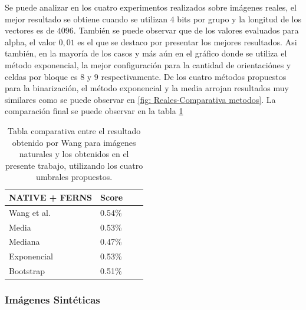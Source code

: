 		Se puede analizar en los cuatro experimentos realizados sobre imágenes reales, el mejor resultado se obtiene cuando se utilizan $4$ bits por grupo y la longitud de los vectores es de $4096$. También se puede observar que de los valores evaluados para alpha, el valor $0,01$ es el que se destaco por presentar los mejores resultados. Asi también, en la mayoría de los casos y más aún en el gráfico donde se utiliza el método exponencial, la mejor configuración para la cantidad de orientaciónes y celdas por bloque es $8$ y $9$ respectivamente. De los cuatro métodos propuestos para la binarización, el método exponencial y la media arrojan resultados muy similares como se puede observar en \ref{fig: Reales-Comparativa metodos}. La comparación final se puede observar en la tabla \ref{table: reales-comparativa}
	\begin{table}
		\centering
		\begin{tabular}{ | l | l | l | p{5cm} |}
    			\hline
    				\textbf{NATIVE + FERNS} & \textbf{Score} \\ \hline
    				Wang et al. & 0.54\% \\ \hline
    				Media & 0.53\% \\ \hline
    				Mediana & 0.47\%\\ \hline
    				Exponencial & 0.53\% \\ \hline
    				Bootstrap & 0.51\%\\ 
    			\hline
    		\end{tabular}
    		\caption[Resultados imagenes naturales vs Wang]{Tabla comparativa entre el resultado obtenido por Wang para imágenes naturales y los obtenidos en el presente trabajo, utilizando los cuatro umbrales propuestos.}
    		\label{table: reales-comparativa}
    	\end{table}
    	
    	
    	\newpage
    	\subsubsection{Imágenes Sintéticas}
    	
